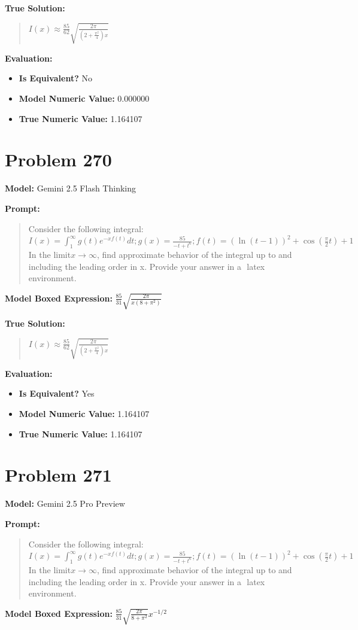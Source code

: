 \documentclass{article}
\begin{document}
{\textbf{True Solution:}
\begin{quote}
$I(x) \approx \frac{85}{62}\sqrt{\frac{2\pi}{(2+\frac{\pi^2}{4})x}}$
\end{quote}

\textbf{Evaluation:}
\begin{itemize}
\item \textbf{Is Equivalent?} No
\item \textbf{Model Numeric Value:} 0.000000
\item \textbf{True Numeric Value:} 1.164107
\end{itemize}
\vspace{1cm}
\section*{Problem 270}
\textbf{Model:} Gemini 2.5 Flash Thinking

\textbf{Prompt:}
\begin{quote}
Consider the following integral:$I(x) = \int_1^\infty g(t) e^{-xf(t)}dt; g(x)=\frac{85}{-t+t^6}; f(t) = (\ln(t-1))^2 + \cos(\frac{\pi}{2} t) + 1$In the limit$x \rightarrow \infty$, find approximate behavior of the integral up to and including the leading order in x. Provide your answer in a $\boxed{}$ latex environment.
\end{quote}
\textbf{Model Boxed Expression:} $\frac{85}{31}\sqrt{\frac{2\pi}{x(8+\pi^2)}}$

\textbf{True Solution:}
\begin{quote}
$I(x) \approx \frac{85}{62}\sqrt{\frac{2\pi}{(2+\frac{\pi^2}{4})x}}$
\end{quote}

\textbf{Evaluation:}
\begin{itemize}
\item \textbf{Is Equivalent?} Yes
\item \textbf{Model Numeric Value:} 1.164107
\item \textbf{True Numeric Value:} 1.164107
\end{itemize}
\vspace{1cm}
\section*{Problem 271}
\textbf{Model:} Gemini 2.5 Pro Preview

\textbf{Prompt:}
\begin{quote}
Consider the following integral:$I(x) = \int_1^\infty g(t) e^{-xf(t)}dt; g(x)=\frac{85}{-t+t^6}; f(t) = (\ln(t-1))^2 + \cos(\frac{\pi}{2} t) + 1$In the limit$x \rightarrow \infty$, find approximate behavior of the integral up to and including the leading order in x. Provide your answer in a $\boxed{}$ latex environment.
\end{quote}
\textbf{Model Boxed Expression:} $\frac{85}{31}\sqrt{\frac{2\pi}{8+\pi^2}}x^{-1/2}$

}
\end{document}
